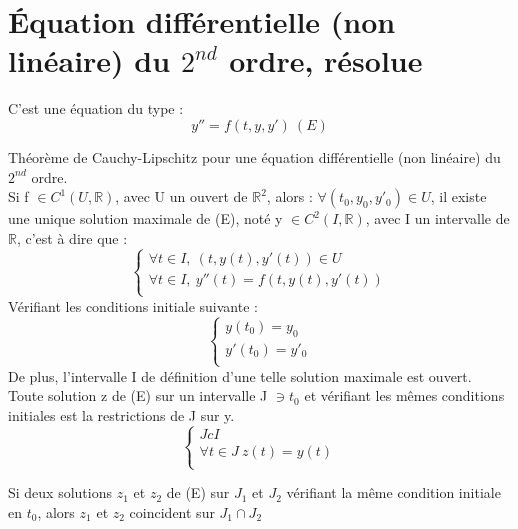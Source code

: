 \section{Équation différentielle (non linéaire) du $2^{nd}$ ordre, résolue}
C'est une équation du type : 
$$y'' = f(t,y,y')~ (E)$$
\begin{theo}
Théorème de Cauchy-Lipschitz pour une équation différentielle (non linéaire) du $2^{nd}$ ordre.\\
Si f $\in C^{1}(U,\mathbb{R})$, avec U un ouvert de $\mathbb{R}^2$, alors :
$\forall{(t_0,y_0,y'_0)} \in U$, il existe une unique solution maximale de (E), noté y $\in C^2(I,\mathbb{R})$, avec I un intervalle de $\mathbb{R}$, c'est à dire que : 
$$\begin{cases}
   \forall t \in I,~ (t,y(t),y'(t)) \in U \\
   \forall t \in I,~ y''(t) = f(t,y(t),y'(t)) \\
  \end{cases}
$$
Vérifiant les conditions initiale suivante :
$$\begin{cases}
   y(t_0) = y_0 \\
   y'(t_0) = y'_0 \\
  \end{cases}
$$
De plus, l'intervalle I de définition d'une telle solution maximale est ouvert.\\
Toute solution z de (E) sur un intervalle J $\ni t_0$ et vérifiant les mêmes conditions initiales est la restrictions de J sur y.\\
$$\begin{cases}
   J c I \\
   \forall t \in J~ z(t)=y(t) \\
  \end{cases}
$$
\end{theo}
\begin{coro}
Si deux solutions $z_1$ et $z_2$ de (E) sur $J_1$ et $J_2$ vérifiant la même condition initiale en $t_0$, alors $z_1$ et $z_2$ coincident sur $J_1 \cap J_2$ 
\end{coro}
